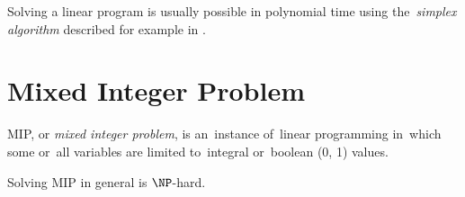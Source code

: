 Solving a linear program is usually possible in polynomial time using the~\textit{simplex algorithm} described for example in \cite{dantzig1998linear}.

\section{Mixed Integer Problem}


\begin{define}
	MIP, or \textit{mixed integer problem}, is an~instance of~linear programming in~which some or~all variables are limited to~integral or~boolean (0, 1) values.
\end{define}

Solving MIP in general is $\NP$-hard.
